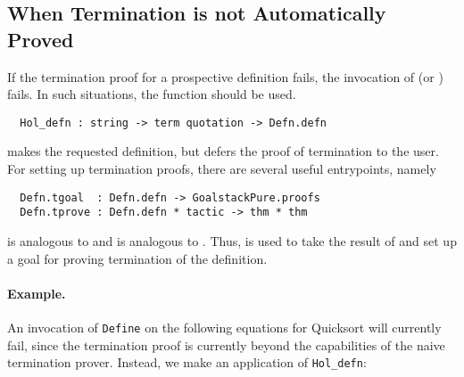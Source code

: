 \subsection{When Termination is not Automatically Proved}

If the termination proof for a prospective definition
fails, the invocation of  (or ) fails. In such
situations, the \ML{} function  should be used.
%

\begin{hol}
\begin{verbatim}
  Hol_defn : string -> term quotation -> Defn.defn
\end{verbatim}
\end{hol}

 makes the requested definition, but defers the proof of
termination to the user. For setting up termination proofs, there are
several useful entrypoints, namely
\begin{hol}
\begin{verbatim}
  Defn.tgoal  : Defn.defn -> GoalstackPure.proofs
  Defn.tprove : Defn.defn * tactic -> thm * thm
\end{verbatim}
\end{hol}
 is analogous to  and  is
analogous to . Thus,  is used to take the 
result of  and set up a goal for proving termination
of the definition.

\paragraph{Example.} An invocation of {\small\verb+Define+} on
the following equations for Quicksort will currently fail, since the
termination proof is currently beyond the capabilities of the naive termination
prover. Instead, we make an application of {\small\verb+Hol_defn+}:

